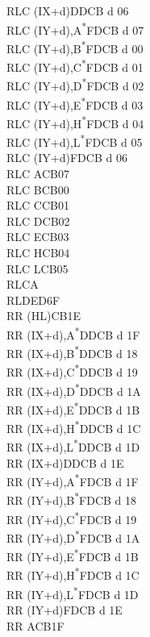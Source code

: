 \documentclass[twoside,openright,a4paper]{book}
\begin{document}
\begin{multicols}{3}
{\begin{tabbing}
	RLC (IX+d)\>DDCB d 06\\
	RLC (IY+d),A\textsuperscript{*}\>FDCB d 07\\
	RLC (IY+d),B\textsuperscript{*}\>FDCB d 00\\
	RLC (IY+d),C\textsuperscript{*}\>FDCB d 01\\
	RLC (IY+d),D\textsuperscript{*}\>FDCB d 02\\
	RLC (IY+d),E\textsuperscript{*}\>FDCB d 03\\
	RLC (IY+d),H\textsuperscript{*}\>FDCB d 04\\
	RLC (IY+d),L\textsuperscript{*}\>FDCB d 05\\
	RLC (IY+d)\>FDCB d 06\\
	RLC A\>CB07\\
	RLC B\>CB00\\
	RLC C\>CB01\\
	RLC D\>CB02\\
	RLC E\>CB03\\
	RLC H\>CB04\\
	RLC L\>CB05\\
	RLCA\\
	RLD\>ED6F\\
	RR (HL)\>CB1E\\
	RR (IX+d),A\textsuperscript{*}\>DDCB d 1F\\
	RR (IX+d),B\textsuperscript{*}\>DDCB d 18\\
	RR (IX+d),C\textsuperscript{*}\>DDCB d 19\\
	RR (IX+d),D\textsuperscript{*}\>DDCB d 1A\\
	RR (IX+d),E\textsuperscript{*}\>DDCB d 1B\\
	RR (IX+d),H\textsuperscript{*}\>DDCB d 1C\\
	RR (IX+d),L\textsuperscript{*}\>DDCB d 1D\\
	RR (IX+d)\>DDCB d 1E\\
	RR (IY+d),A\textsuperscript{*}\>FDCB d 1F\\
	RR (IY+d),B\textsuperscript{*}\>FDCB d 18\\
	RR (IY+d),C\textsuperscript{*}\>FDCB d 19\\
	RR (IY+d),D\textsuperscript{*}\>FDCB d 1A\\
	RR (IY+d),E\textsuperscript{*}\>FDCB d 1B\\
	RR (IY+d),H\textsuperscript{*}\>FDCB d 1C\\
	RR (IY+d),L\textsuperscript{*}\>FDCB d 1D\\
	RR (IY+d)\>FDCB d 1E\\
	RR A\>CB1F\\

\end{tabbing}}
\end{multicols}
\end{document}
